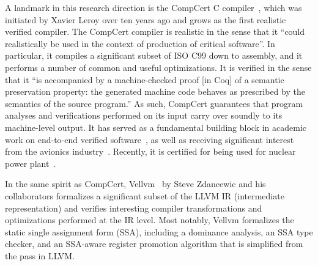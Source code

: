 A landmark in this research direction is the CompCert C compiler~\cite{compcert}, which was
initiated by Xavier Leroy over ten years ago and grows as the first realistic verified compiler.
The CompCert compiler is realistic in the sense that it ``could realistically be used in the context
of production of critical software''.  In particular, it compiles a significant subset of ISO C99
down to assembly, and it performs a number of common and useful optimizations.  It is verified in
the sense that it ``is accompanied by a machine-checked proof [in Coq] of a semantic preservation
property: the generated machine code behaves as prescribed by the semantics of the source program.''
As such, CompCert guarantees that program analyses and verifications performed on its input carry
over soundly to its machine-level output.  It has served as a fundamental building block in academic
work on end-to-end verified software~\cite{TODO}, as well as receiving significant interest from the
avionics industry~\cite{TODO}.  Recently, it is certified for being used for nuclear power
plant~\cite{compcert-nuclear}.


In the same spirit as CompCert, Vellvm~\cite{vellvm} by Steve Zdancewic and his collaborators
formalizes a significant subset of the LLVM IR (intermediate representation) and verifies
interesting compiler transformations and optimizations performed at the IR level.  Most notably,
Vellvm formalizes the static single assignment form (SSA), including a dominance analysis, an SSA
type checker, and an SSA-aware register promotion algorithm that is simplified from the
 pass in LLVM.

